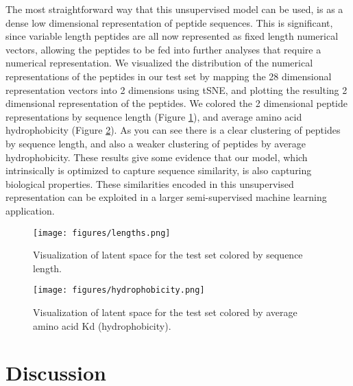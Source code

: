 \documentclass[final,1p,times,twocolumn]{elsarticle}
\begin{document}
The most straightforward way that this unsupervised model can be used, is as a dense low dimensional representation of peptide sequences. This is significant, since variable length peptides are all now represented as fixed length numerical vectors, allowing the peptides to be fed into further analyses that require a numerical representation. We visualized the distribution of the numerical representations of the peptides in our test set by mapping the 28 dimensional representation vectors into 2 dimensions using tSNE, and plotting the resulting 2 dimensional representation of the peptides. We colored the 2 dimensional peptide representations by sequence length (Figure \ref{lengths}), and average amino acid hydrophobicity (Figure \ref{hydrophobicity}). As you can see there is a clear clustering of peptides by sequence length, and also a weaker clustering of peptides by average hydrophobicity. These results give some evidence that our model, which intrinsically is optimized to capture sequence similarity, is also capturing biological properties. These similarities encoded in this unsupervised representation can be exploited in a larger semi-supervised machine learning application.

\begin{figure}
  \centering
  \texttt{[image: figures/lengths.png]}
  \caption{Visualization of latent space for the test set colored by sequence length.}
  \label{lengths}
\end{figure}

\begin{figure}
  \centering
  \texttt{[image: figures/hydrophobicity.png]}
  \caption{Visualization of latent space for the test set colored by average amino acid Kd (hydrophobicity).}
  \label{hydrophobicity}
\end{figure}


\section{Discussion}
\end{document}
